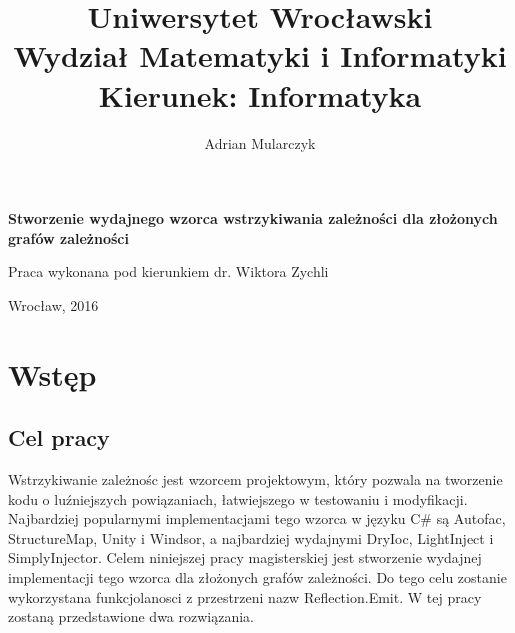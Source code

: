 \documentclass[12pt]{article}
\title{\LARGE{Uniwersytet Wrocławski}\\
\Large{Wydział Matematyki i Informatyki}\\
\large{Kierunek: Informatyka}}
\date{}
\begin{document}
\pagestyle{empty}

\begin{titlepage}
\maketitle
\thispagestyle{empty}


\begin{center}
\author{\LARGE{Adrian Mularczyk}}
\vspace{30pt}

\huge{\textbf{Stworzenie wydajnego wzorca wstrzykiwania zależności dla złożonych grafów zależności}}
\vspace{50pt}
\end{center}

\begin{flushright}
\large{Praca wykonana pod kierunkiem}
\large{dr. Wiktora Zychli}
\end{flushright}

\vfill
\begin{center}
\begin{large}
Wrocław, 2016
\end{large}
\end{center}
\end{titlepage}

\setlength{\parindent}{0pt}	%
\setlength{\parskip}{1.5ex} 
\renewcommand*{\figurename}{Rys.}
\renewcommand*{\tablename}{Tab.} 
\renewcommand{\captionsize}{\small}

\clearpage

\tableofcontents

\clearpage

\section{Wstęp}
\subsection{Cel pracy}
Wstrzykiwanie zależnośc jest wzorcem projektowym, który pozwala na tworzenie kodu o luźniejszych powiązaniach, łatwiejszego w testowaniu i modyfikacji. Najbardziej popularnymi implementacjami tego wzorca w języku C\# są Autofac, StructureMap, Unity i Windsor, a najbardziej wydajnymi DryIoc, LightInject i SimplyInjector. Celem niniejszej pracy magisterskiej jest stworzenie wydajnej implementacji tego wzorca dla złożonych grafów zależności. Do tego celu zostanie wykorzystana funkcjolanosci z przestrzeni nazw Reflection.Emit. W tej pracy zostaną przedstawione dwa rozwiązania.
\end{document}
